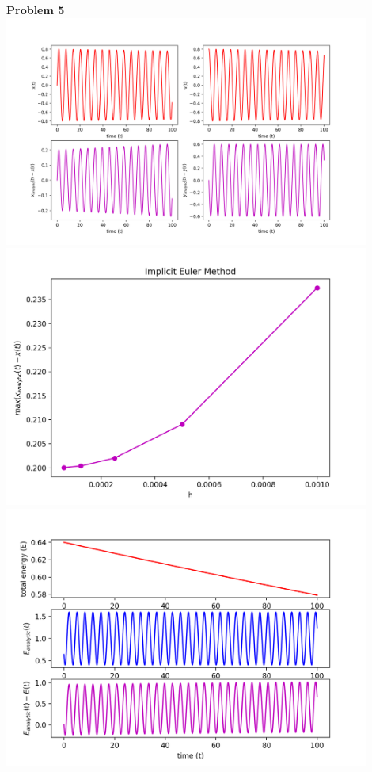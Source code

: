 \documentclass[12pt]{article}
\begin{document}
	\indent\textbf{Problem 5}\\
		\includegraphics[width=0.9\textwidth]{Figure_4.png}\\
		\includegraphics[width=0.9\textwidth]{Figure_6.png}\\
		\includegraphics[width=0.9\textwidth]{Figure_5.png}\\
\end{document}
